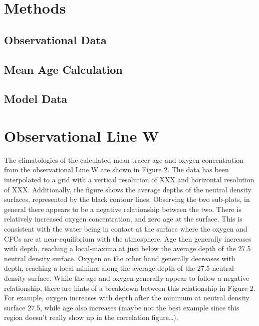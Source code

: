 

\section{Methods}
\label{section:methods}

\subsection{Observational Data}

\subsection{Mean Age Calculation}

\subsection{Model Data}

\section{Observational Line W}

The climatologies of the calculated mean tracer age and oxygen concentration from the observational Line W are shown in Figure 2. The data has been interpolated to a grid with a vertical resolution of XXX and horizontal resolution of XXX. Additionally, the figure shows the average depths of the neutral density surfaces, represented by the black contour lines. Observing the two sub-plots, in general there appears to be a negative relationship between the two. There is relatively increased oxygen concentration, and zero age at the surface. This is consistent with the water being in contact at the surface where the oxygen and CFCs are at near-equilibrium with the atmosphere. Age then generally increases with depth, reaching a local-maxima at just below the average depth of the 27.5 neutral density surface. Oxygen on the other hand generally decreases with depth, reaching a local-minima along the average depth of the 27.5 neutral density surface. While the age and oxygen generally appear to follow a negative relationship, there are hints of a breakdown between this relationship in Figure 2. For example, oxygen increases with depth after the minimum at neutral density surface 27.5, while age also increases (maybe not the best example since this region doesn’t really show up in the correlation figure…).

